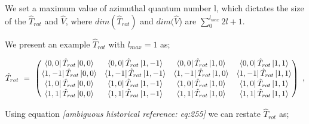 \documentclass{article}
\begin{document}
We set a maximum value of azimuthal quantum number l, which dictates the size of the \begin{math} \hat{T}_{rot} \end{math} and \begin{math} \hat{V} \end{math}, where \begin{math} dim(\hat{T}_{rot}) \end{math} and \begin{math} dim(\hat{V} \end{math}) are \begin{math} \sum_{0}^{l_{max}} 2l + 1 \end{math}. 

We present an example \begin{math} \hat{T}_{rot} \end{math} with \begin{math} l_{max} = 1 \end{math} as;

\begin{equation} \label{eb-eq-266-2}
\hat{T}_{rot} \hspace{0.125cm} = \hspace{0.125cm} \begin{pmatrix} \bra{0,0}\hat{T}_{rot}\ket{0,0} & \bra{0,0}\hat{T}_{rot}\ket{1,-1} & \bra{0,0}\hat{T}_{rot}\ket{1,0} & \bra{0,0}\hat{T}_{rot}\ket{1,1} \\ \bra{1,-1}\hat{T}_{rot}\ket{0,0} & \bra{1,-1}\hat{T}_{rot}\ket{1,-1} & \bra{1,-1}\hat{T}_{rot}\ket{1,0} & \bra{1,-1}\hat{T}_{rot}\ket{1,1} \\ \bra{1,0}\hat{T}_{rot}\ket{0,0} & \bra{1,0}\hat{T}_{rot}\ket{1,-1} & \bra{1,0}\hat{T}_{rot}\ket{1,0} & \bra{1,0}\hat{T}_{rot}\ket{1,1} \\ \bra{1,1}\hat{T}_{rot}\ket{0,0} & \bra{1,1}\hat{T}_{rot}\ket{1,-1} & \bra{1,1}\hat{T}_{rot}\ket{1,0} & \bra{1,1}\hat{T}_{rot}\ket{1,1}
\end{pmatrix} \hspace{0.125cm} ,
\end{equation} 

Using equation \textit{[ambiguous historical reference: eq:255]} we can restate \begin{math} \hat{T}_{rot} \end{math} as;
\end{document}
